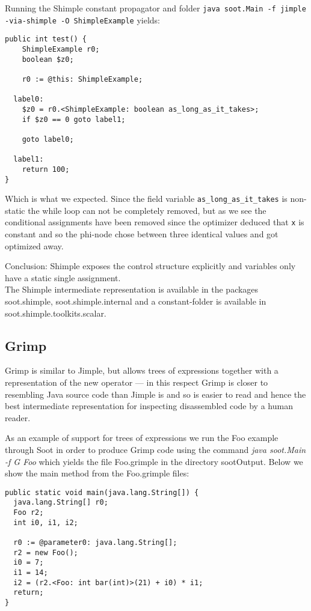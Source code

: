 \documentclass{article}
\newcommand{\code}[1]{\texttt{\small #1}}
\begin{document}
Running the Shimple constant propagator and folder \code{java
soot.Main -f jimple -via-shimple -O ShimpleExample} yields:

\begin{verbatim}
public int test() {
    ShimpleExample r0;
    boolean $z0;
 
    r0 := @this: ShimpleExample;

  label0:
    $z0 = r0.<ShimpleExample: boolean as_long_as_it_takes>;
    if $z0 == 0 goto label1;

    goto label0;

  label1:
    return 100;
}
\end{verbatim}

Which is what we expected. Since the field variable
\code{as\_long\_as\_it\_takes} is non-static the while loop can not be
completely removed, but as we see the conditional assignments have
been removed since the optimizer deduced that \code{x} is constant and
so the phi-node chose between three identical values and got optimized
away.

Conclusion: Shimple exposes the control structure explicitly and
variables only have a static single assignment.\\

The Shimple intermediate representation is available in the packages
 soot.\-shimple, soot.\-shimple.internal and a constant\--folder is
available in soot.\-shimple.\-toolkits.scalar.


\subsection{Grimp}
Grimp is similar to Jimple, but allows trees of expressions together
with a representation of the \textsf{new} operator --- in this respect
Grimp is closer to resembling Java source code than Jimple is and so
is easier to read and hence the best intermediate representation for
inspecting disassembled code by a human reader.

As an example of support for trees of expressions we run the Foo
example through Soot in order to produce Grimp code using the command
\textit{java soot.Main -f G Foo} which yields the file Foo.grimple in
the directory sootOutput. Below we show the \textsf{main} method from
the Foo.grimple files:

\begin{center}
  \begin{minipage}{0.7 \linewidth}
    \begin{verbatim}
public static void main(java.lang.String[]) {
  java.lang.String[] r0;
  Foo r2;
  int i0, i1, i2;

  r0 := @parameter0: java.lang.String[];
  r2 = new Foo();
  i0 = 7;
  i1 = 14;
  i2 = (r2.<Foo: int bar(int)>(21) + i0) * i1;
  return;
}
    \end{verbatim}
  \end{minipage}
\end{center}
\end{document}
